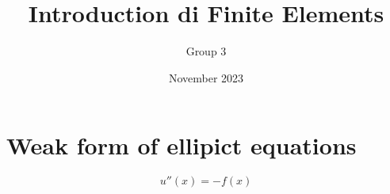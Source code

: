 \documentclass{article}
\title{Introduction di Finite Elements}
\author{Group 3}
\date{November 2023}
\begin{document}
\maketitle

\section{Weak form of ellipict equations}
\begin{equation}
    u''(x) = -f(x)    
\end{equation}
\end{document}
